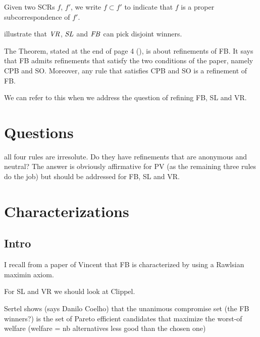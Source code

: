 \documentclass[version=3.21, pagesize, twoside=off, bibliography=totoc, DIV=calc, fontsize=12pt, a4paper]{scrartcl}
\begin{document}
Given two SCRs $f$, $f'$, we write $f \subset f'$ to indicate that $f$ is a proper subcorrespondence of $f'$.

 illustrate that $\mathit{VR}$, $\mathit{SL}$ and $\mathit{FB}$ can pick disjoint winners.

The Theorem, stated at the end of page 4 (), is about refinements of FB. It says that FB admits refinements that satisfy the two conditions of the paper, namely CPB and SO. Moreover, any rule that satisfies CPB and SO is a refinement of FB.

We can refer to this when we address the question of refining FB, SL and VR.

\section{Questions}
all four rules are irresolute. Do they have refinements that are anonymous and neutral? The answer is obviously affirmative for PV (as the remaining three rules do the job) but should be addressed for FB, SL and VR. 

\section{Characterizations}
\subsection{Intro}
I recall from a paper of Vincent that FB is characterized by using a Rawlsian maximin axiom. 

For SL and VR we should look at Clippel. 

Sertel shows (says Danilo Coelho) that the unanimous compromise set (the FB winners?) is the set of Pareto efficient candidates that maximize the worst-of welfare (welfare = nb alternatives less good than the chosen one)
\end{document}

